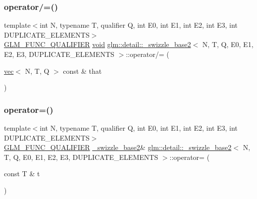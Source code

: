 \mbox{\label{structglm_1_1detail_1_1__swizzle__base2_ad4ef23a8bcf9b2474f08c5f1960e3fbd}} 
\subsubsection{\texorpdfstring{operator/=()}{operator/=()}}
{\footnotesize\ttfamily template$<$int N, typename T, qualifier Q, int E0, int E1, int E2, int E3, int D\+U\+P\+L\+I\+C\+A\+T\+E\+\_\+\+E\+L\+E\+M\+E\+N\+TS$>$ \\
\hyperlink{setup_8hpp_a33fdea6f91c5f834105f7415e2a64407}{G\+L\+M\+\_\+\+F\+U\+N\+C\+\_\+\+Q\+U\+A\+L\+I\+F\+I\+ER} \hyperlink{_s_d_l__opengles2__gl2ext_8h_ae5d8fa23ad07c48bb609509eae494c95}{void} \hyperlink{structglm_1_1detail_1_1__swizzle__base2}{glm\+::detail\+::\+\_\+swizzle\+\_\+base2}$<$ N, T, Q, E0, E1, E2, E3, D\+U\+P\+L\+I\+C\+A\+T\+E\+\_\+\+E\+L\+E\+M\+E\+N\+TS $>$\+::operator/= (\begin{DoxyParamCaption}\item[{\hyperlink{structglm_1_1vec}{vec}$<$ N, T, Q $>$ const \&}]{that }\end{DoxyParamCaption})\hspace{0.3cm}{\ttfamily [inline]}}

\mbox{\label{structglm_1_1detail_1_1__swizzle__base2_a48c3cc524e3e408243a1ee4ef42cd90c}} 
\subsubsection{\texorpdfstring{operator=()}{operator=()}\hspace{0.1cm}{\footnotesize\ttfamily [1/2]}}
{\footnotesize\ttfamily template$<$int N, typename T, qualifier Q, int E0, int E1, int E2, int E3, int D\+U\+P\+L\+I\+C\+A\+T\+E\+\_\+\+E\+L\+E\+M\+E\+N\+TS$>$ \\
\hyperlink{setup_8hpp_a33fdea6f91c5f834105f7415e2a64407}{G\+L\+M\+\_\+\+F\+U\+N\+C\+\_\+\+Q\+U\+A\+L\+I\+F\+I\+ER} \hyperlink{structglm_1_1detail_1_1__swizzle__base2}{\+\_\+swizzle\+\_\+base2}\& \hyperlink{structglm_1_1detail_1_1__swizzle__base2}{glm\+::detail\+::\+\_\+swizzle\+\_\+base2}$<$ N, T, Q, E0, E1, E2, E3, D\+U\+P\+L\+I\+C\+A\+T\+E\+\_\+\+E\+L\+E\+M\+E\+N\+TS $>$\+::operator= (\begin{DoxyParamCaption}\item[{const T \&}]{t }\end{DoxyParamCaption})\hspace{0.3cm}{\ttfamily [inline]}}

